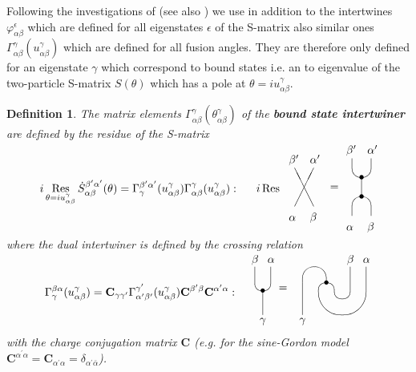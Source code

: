 \documentclass[a4paper,a4paper]{article}
\newtheorem{definition}{Definition}
\def\limfunc#1{\mathop{\rm #1}}
\begin{document}
Following the investigations of \cite{K1} (see also \cite{Q}) we use in
addition to the intertwines $\varphi _{\alpha \beta }^{\epsilon }$ which are
defined for all eigenstates $\epsilon $ of the S-matrix also similar ones $%
\Gamma _{\alpha \beta }^{\gamma }(u_{\alpha \beta }^{\gamma })$ which are
defined for all fusion angles. They are therefore only defined for an
eigenstate $\gamma $ which correspond to bound states i.e. an to eigenvalue
of the two-particle S-matrix $S(\theta )$ which has a pole at $\theta
=iu_{\alpha \beta}^{\gamma }$.

\begin{definition}
The matrix elements $\Gamma _{\alpha \beta }^{\gamma }(\theta _{\alpha \beta
}^{\gamma })$ of the \textbf{bound state intertwiner} are defined by the
residue of the S-matrix 
\begin{equation}
i\mathop{\rm Res}_{\theta =iu_{\alpha \beta }^{\gamma }}\dot{S}_{\alpha
\beta }^{\beta ^{\prime }\alpha ^{\prime }}(\theta )=\Gamma _{\gamma
}^{\beta ^{\prime }\alpha ^{\prime }}(u_{\alpha \beta }^{\gamma })\Gamma
_{\alpha \beta }^{\gamma }(u_{\alpha \beta }^{\gamma }):\quad 
\begin{array}{l}
\unitlength3mm%
\begin{picture}(12,8) \put(0,3.5){$i\limfunc{Res}$} \put(4,2){\line(1,2){2}} \put(6,2){\line(-1,2){2}} \put(3.4,.5){$\alpha$} \put(5.6,.5){$\beta$} \put(5.6,6.5){$\alpha'$} \put(3.4,6.5){$\beta'$} \put(7.7,3.7){$=$} \put(9.4,-.5){$\alpha$} \put(11.6,-.5){$\beta$} \put(11.6,7.5){$\alpha'$} \put(9.4,7.5){$\beta'$} \put(11,1){\oval(2,4)[t]} \put(11,3){\line(0,1){2}} \put(11,3){\makebox(0,0){$\bullet$}}
\put(11,5){\makebox(0,0){$\bullet$}} \put(11,7){\oval(2,4)[b]} \end{picture}
\end{array}
\label{b1.40}
\end{equation}
where the dual intertwiner is defined by the crossing relation 
\begin{equation}
\Gamma _{\gamma }^{\beta \alpha }(u_{\alpha \beta }^{\gamma })=\mathbf{C}%
_{\gamma \gamma ^{\prime }}\Gamma _{\alpha ^{\prime }\beta ^{\prime
}}^{\gamma ^{\prime }}(u_{\alpha \beta }^{\gamma })\mathbf{C}^{\beta
^{\prime }\beta }\mathbf{C}^{\alpha ^{\prime }\alpha }:\quad 
\begin{array}{l}
\unitlength2.5mm%
\begin{picture}(14,8) \put(1,7){\oval(2,6)[b]} \put(1,1){\line(0,1){3}} \put(1,4){\makebox(0,0){$\bullet$}} \put(.6,0){$\gamma$}
\put(-.4,7.5){$\beta$} \put(1.6,7.5){$\alpha$} \put(3,4){$=$}
\put(6,1){\line(0,1){4}} \put(7.5,5){\oval(3,4)[t]}
\put(9,5){\makebox(0,0){$\bullet$}} \put(9,4){\oval(2,2)[t]} \put(11,4){\oval(2,2)[b]} \put(11,4){\oval(6,6)[b]} \put(12,4){\line(0,1){3}} \put(14,4){\line(0,1){3}} \put(5.6,0){$\gamma$} \put(11.6,7.5){$\beta$} \put(13.6,7.5){$\alpha$} \end{picture}
\end{array}
\label{b1.43}
\end{equation}
with the charge conjugation matrix $\mathbf{C}$ (e.g. for the sine-Gordon
model $\mathbf{C}^{\alpha ^{\prime }\alpha }=\mathbf{C}_{\alpha ^{\prime
}\alpha }=\delta _{\alpha ^{\prime }\bar{\alpha}}$).
\end{definition}
\end{document}
